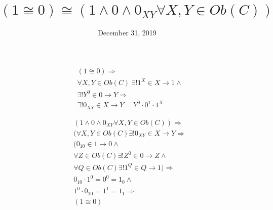 \documentclass[11pt]{article}
\date{December 31, 2019}
\title{$(1 \cong 0) \cong (1 \land 0 \land 0_{XY} \forall X, Y \in Ob(C))$}
\begin{document}
\maketitle

\begin{equation}
\tag{to}
\begin{aligned}
& (1 \cong 0) \Rightarrow \\
& \forall X, Y \in Ob(C)\; \exists! 1^{X} \in X \rightarrow 1 \land \\
& \exists! Y^{0} \in 0 \rightarrow Y \Rightarrow \\
& \exists! 0_{XY} \in X \rightarrow Y = Y^{0} \cdot 0^{1} \cdot 1^{X}
\end{aligned}
\end{equation}

\begin{equation}
\tag{from}
\begin{aligned}
& (1 \land 0 \land 0_{XY} \forall X, Y \in Ob(C)) \Rightarrow \\
& (\forall X, Y \in Ob(C) \exists! 0_{XY} \in X \rightarrow Y \Rightarrow \\
& (0_{10} \in 1 \rightarrow 0 \land \\
& \forall Z \in Ob(C) \exists! Z^{0} \in 0 \rightarrow Z \land \\
& \forall Q \in Ob(C) \exists! 1^{Q} \in Q \rightarrow 1) \Rightarrow \\
& 0_{10} \cdot 1^{0} = 0^{0} = 1_{0} \land \\
& 1^{0} \cdot 0_{10} = 1^{1} = 1_{1} \Rightarrow \\
& (1 \cong 0)
\end{aligned}
\end{equation}
\end{document}

